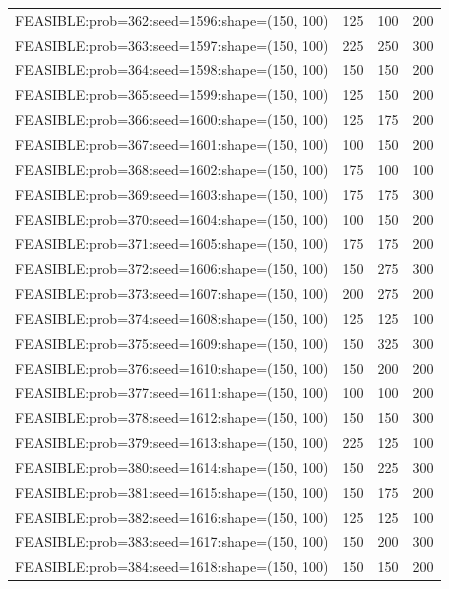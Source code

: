 \begin{longtable}{lccc}
FEASIBLE:prob=362:seed=1596:shape=(150, 100) &      125 &   100 &    200 \\
FEASIBLE:prob=363:seed=1597:shape=(150, 100) &      225 &   250 &    300 \\
FEASIBLE:prob=364:seed=1598:shape=(150, 100) &      150 &   150 &    200 \\
FEASIBLE:prob=365:seed=1599:shape=(150, 100) &      125 &   150 &    200 \\
FEASIBLE:prob=366:seed=1600:shape=(150, 100) &      125 &   175 &    200 \\
FEASIBLE:prob=367:seed=1601:shape=(150, 100) &      100 &   150 &    200 \\
FEASIBLE:prob=368:seed=1602:shape=(150, 100) &      175 &   100 &    100 \\
FEASIBLE:prob=369:seed=1603:shape=(150, 100) &      175 &   175 &    300 \\
FEASIBLE:prob=370:seed=1604:shape=(150, 100) &      100 &   150 &    200 \\
FEASIBLE:prob=371:seed=1605:shape=(150, 100) &      175 &   175 &    200 \\
FEASIBLE:prob=372:seed=1606:shape=(150, 100) &      150 &   275 &    300 \\
FEASIBLE:prob=373:seed=1607:shape=(150, 100) &      200 &   275 &    200 \\
FEASIBLE:prob=374:seed=1608:shape=(150, 100) &      125 &   125 &    100 \\
FEASIBLE:prob=375:seed=1609:shape=(150, 100) &      150 &   325 &    300 \\
FEASIBLE:prob=376:seed=1610:shape=(150, 100) &      150 &   200 &    200 \\
FEASIBLE:prob=377:seed=1611:shape=(150, 100) &      100 &   100 &    200 \\
FEASIBLE:prob=378:seed=1612:shape=(150, 100) &      150 &   150 &    300 \\
FEASIBLE:prob=379:seed=1613:shape=(150, 100) &      225 &   125 &    100 \\
FEASIBLE:prob=380:seed=1614:shape=(150, 100) &      150 &   225 &    300 \\
FEASIBLE:prob=381:seed=1615:shape=(150, 100) &      150 &   175 &    200 \\
FEASIBLE:prob=382:seed=1616:shape=(150, 100) &      125 &   125 &    100 \\
FEASIBLE:prob=383:seed=1617:shape=(150, 100) &      150 &   200 &    300 \\
FEASIBLE:prob=384:seed=1618:shape=(150, 100) &      150 &   150 &    200 \\

\end{longtable}
